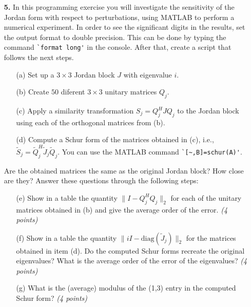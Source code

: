 \documentclass[12pt]{report}
\begin{document}
\begin{enumerate}
\pagebreak

  \item[\textbf{5.}] In this programming exercise you will investigate the
    sensitivity of the Jordan form with respect to perturbations, using MATLAB
    to perform a numerical experiment. In order to see the significant
    digits in the results, set the output format to double precision. This can
    be done by typing the command \verb+`format long'+ in the console. After that,
    create a script that follows the next steps.

    \begin{enumerate}
      \item[(a)] Set up a $3\times3$ Jordan block $J$ with eigenvalue $i$.
      \item[(b)] Create $50$ diferent $3\times3$ unitary matrices $Q_j$.
      \item[(c)] Apply a similarity transformation ${S}_j=Q^H_jJQ_j$ to the
        Jordan block using each of the orthogonal matrices from (b).
      \item[(d)] Compute a Schur form of the matrices obtained in (c), i.e.,
      $\tilde{S}_{j}=\tilde{Q}^H_j\tilde{J}_j\tilde{Q}_j$. You can use the
      MATLAB command \verb+`[~,B]=schur(A)'+.
\end{enumerate}

Are the obtained matrices the same as the original Jordan block? How
    close are they? Answer these questions through the following steps:
    \begin{enumerate}
        \item[(e)] Show in a table the quantity $\|I-Q_j^HQ_j\|_2$ for each of the unitary
          matrices obtained in (b) and give the average order of the error. \textit{(4 points)}
        \item[(f)] Show in a table the quantity $\|iI-\text{diag}(\tilde{J}_j)\|_2$ for the matrices obtained in item (d). Do the computed Schur forms recreate the original eigenvalues? What is the average order of the error of the eigenvalues? \textit{(4 points)}
        \item[(g)] What is the (average) modulus of the (1,3) entry in the computed Schur form? \textit{(4 points)}
  \end{enumerate}

  \end{enumerate}
\end{document}
